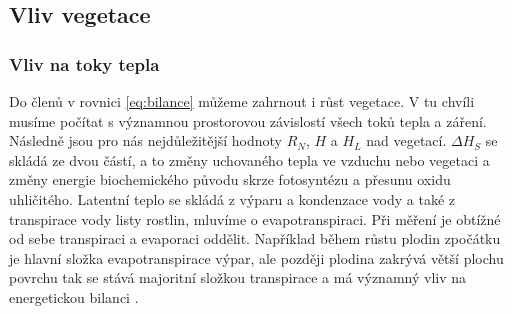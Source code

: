 


\subsection{Vliv vegetace} \label{chap:veg}
\subsubsection{Vliv na toky tepla}
Do členů v rovnici \ref{eq:bilance} můžeme zahrnout i růst vegetace. V tu chvíli musíme počítat s významnou prostorovou závislostí všech toků tepla a záření. Následně jsou pro nás nejdůležitější hodnoty $R_N$, $H$ a $H_L$ nad vegetací. $\Delta H_S$ se skládá ze dvou částí, a to změny uchovaného tepla ve vzduchu nebo vegetaci a změny energie biochemického původu skrze fotosyntézu a přesunu oxidu uhličitého. Latentní teplo se skládá z výparu a kondenzace vody a také z transpirace vody listy rostlin, mluvíme o evapotranspiraci. Při měření je obtížné od sebe transpiraci a evaporaci oddělit. Například během růstu plodin zpočátku je hlavní složka evapotranspirace výpar, ale později plodina zakrývá větší plochu povrchu tak se stává majoritní složkou transpirace a má významný vliv na energetickou bilanci \parencite{arya2001, evapotranspiration}. 


